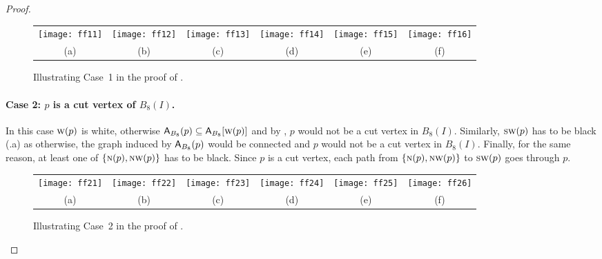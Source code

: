 \documentclass[lotsofwhite,charterfonts]{patmorin}
\newcommand{\N}{\textsc{n}}
\newcommand{\SW}{\textsc{sw}}
\newcommand{\W}{\textsc{w}}
\newcommand{\NW}{\textsc{nw}}
\newcommand{\A}[2]{\ensuremath{\protect\textup{\textsf{A}}_{#2}(#1)}}
\newcommand{\AC}[2]{\ensuremath{\protect\textup{\textsf{A}}_{#2}[#1]}}
\newcommand{\se}{\ensuremath{\subseteq}}
\begin{document}
\begin{proof}
\begin{figure}[htbp]
\begin{center}
\begin{tabular}{cccccc}
\texttt{[image: ff11]} & 
\texttt{[image: ff12]} & 
\texttt{[image: ff13]} & 
\texttt{[image: ff14]} & 
\texttt{[image: ff15]} &
\texttt{[image: ff16]}
\\
(a) & (b) & (c) & (d) & (e) & (f)
\end{tabular}
\end{center}
\caption{Illustrating Case~1 in the proof of .}
\end{figure}



\paragraph{Case 2: $p$ is a cut vertex of $B_8(I)$.} In this case
$\W(p)$ is white, otherwise $\A{p}{B_8}\se \AC{\W(p)}{B_8}$ and by
, $p$ would not be a cut vertex in $B_8(I)$.
Similarly, $\SW(p)$ has to be black (.a) as otherwise,
the graph induced by $\A{p}{B_8}$ would be connected and $p$ would not
be a cut vertex in $B_8(I)$. Finally, for the same reason, at least
one of $\{\N(p), \NW(p)\}$ has to be black. Since $p$ is a cut vertex,
each path from $\{\N(p), \NW(p)\}$ to $\SW(p)$ goes through $p$.

\begin{figure}[htbp]
\begin{center}
\begin{tabular}{cccccc}
\texttt{[image: ff21]} &
\texttt{[image: ff22]} &
\texttt{[image: ff23]} &
\texttt{[image: ff24]} &
\texttt{[image: ff25]} &
 \texttt{[image: ff26]}
\\
(a) & (b) & (c) & (d) & (e)& (f)
\end{tabular}
\end{center}
\caption{Illustrating Case~2 in the proof of .}
\end{figure}



\end{proof}
\end{document}
